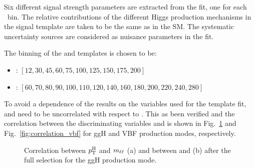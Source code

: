 Six different signal strength parameters are extracted from the fit, one for each \pth~bin. The relative contributions of the different Higgs production mechanisms in the signal template are taken to be the same as in the SM. The systematic uncertainty sources are considered as nuisance parameters in the fit.

The binning of the \mll and \mt templates is chosen to be:
\begin{itemize}
\item {\mll: $[12,30,45,60,75,100,125,150,175,200]$} 
\item {\mt: $[60,70,80,90,100,110,120,140,160,180,200,220,240,280]$}
\end{itemize}

To avoid a dependence of the results on the variables used for the template fit, \mll and \mt need to be uncorrelated with respect to \pth.
This as been verified and the correlation between the discriminating variables and \pth is shown in Fig.~\ref{fig:correlation_ggH} and Fig.~\ref{fig:correlation_vbf} for ggH and VBF production modes, respectively.

\begin{figure}[htb]
\centering
{}
\caption{Correlation between $p_\mathrm{T}^\mathrm{H}$ and $m_{\ell\ell}$ (a) and between \pth and \mt (b) after the full selection for the ggH production mode.\label{fig:correlation_ggH}}
\end{figure}


